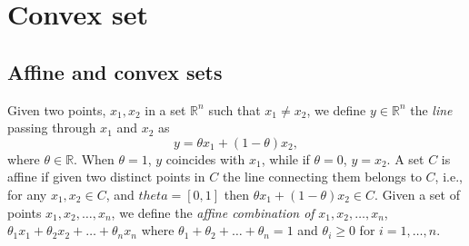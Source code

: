 \section{Convex set\label{sec:convex_set}}

\subsection{Affine and convex sets\label{sec:affine_convex_sets}}
Given two points, $x_1, x_2$ in a set $\mathbb{R}^n$ such that $x_1 \ne x_2$, we define $y\in\mathbb{R}^n$ the \emph{line} passing through $x_1$ and $x_2$ as
\begin{equation}
    y = \theta x_1 + ( 1-\theta) x_2,
\end{equation}
where $\theta \in \mathbb{R}$. When $\theta = 1$, $y$ coincides with $x_1$, while if $\theta = 0$, $y = x_2$.
A set $C$ is affine if given two distinct points in $C$ the line connecting them belongs to $C$, i.e., for any $x_1, x_2 \in C$, and $theta = [0,1]$ then $\theta x_1 + ( 1-\theta) x_2 \in C$. Given a set of points $x_1, x_2, \dots, x_n$, we define the \emph{affine combination of} $x_1, x_2, \dots, x_n$, $\theta_1 x_1 +  \theta_2 x_2 + \dots + \theta_n x_n$ where  $\theta_1+ \theta_2+ \dots +  \theta_n = 1$ and $\theta_i \ge 0$ for $i = 1, \dots, n$.

